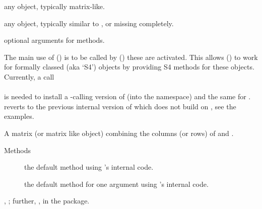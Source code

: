 %
\begin{Arguments}
\begin{ldescription}
\item[\code{x}] any \R{} object, typically matrix-like.
\item[\code{y}] any \R{} object, typically similar to , or missing
completely.
\item[\code{...}] optional arguments for methods.
\end{ldescription}
\end{Arguments}
%
\begin{Details}\relax
The main use of  () is to be called by
  ()
 these are activated.  This allows 
() to work for formally classed (aka `S4')
objects by providing S4 methods for these objects.  Currently, a call\\{}
\\{}
is needed to install a
-calling version of  (into the
 namespace) and the same for .\\{}
 reverts to the
previous internal version of  which does not build on
, see the examples.
\end{Details}
%
\begin{Value}
A matrix (or matrix like object) combining the columns (or rows) of
 and .
\end{Value}
%
\begin{Section}{Methods}
\begin{description}

\item[] the default method
using \R{}'s internal code.
\item[] the default method
for one argument using \R{}'s internal code.

\end{description}

\end{Section}
%
\begin{SeeAlso}\relax
{}, ;
further, ,  in
the  package.
\end{SeeAlso}
%
